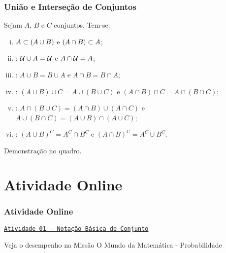 \documentclass[brazil, notheorems, 10pt]{beamer}
\begin{document}
\begin{frame}
\frametitle{União e Interseção de Conjuntos} %
\begin{Prop} \label{propuniaoint}
Sejam $A$, $B$ e $C$ conjuntos. Tem-se:
\begin{enumerate}[i.]
  \item $A \subset \left(A \cup B\right)$ e $\left(A \cap B\right) \subset A$;
  \item {}: $\mathcal U \cup A = \mathcal U$ e $A \cap \mathcal U = A$;
  \item {}: $A \cup B = B \cup A$ e $A \cap B = B \cap A$;
  \item {}: $\left(A \cup B \right) \cup C = A
  \cup \left( B \cup C \right)$ e $\left(A \cap B \right) \cap C = A
  \cap \left( B \cap C \right)$;

  \item {}: $A \cap
  \left( B \cup C \right) = \left(A \cap B \right) \cup \left( A \cap C
  \right)$ e $A \cup \left( B \cap C \right) = \left(A \cup B \right) \cap
  \left( A \cup C  \right)$;

  \item {}: $\left( A \cup B \right)^C = A^C \cap
  B^C$ e $\left(A \cap B \right)^C = A^C \cup B^C$.

  \end{enumerate}
\end{Prop}

Demonstração no quadro.


\end{frame}

\section{Atividade Online}
\begin{frame}
\frametitle{Atividade Online} %

\href{https://pt.khanacademy.org/math/statistics-probability/probability-library/basic-set-ops/e/basic_set_notation}
{{\tt Atividade 01 - Notação Básica de Conjunto}}

Veja o desempenho na Missão O Mundo da Matemática - Probabilidade


\end{frame}
\end{document}
